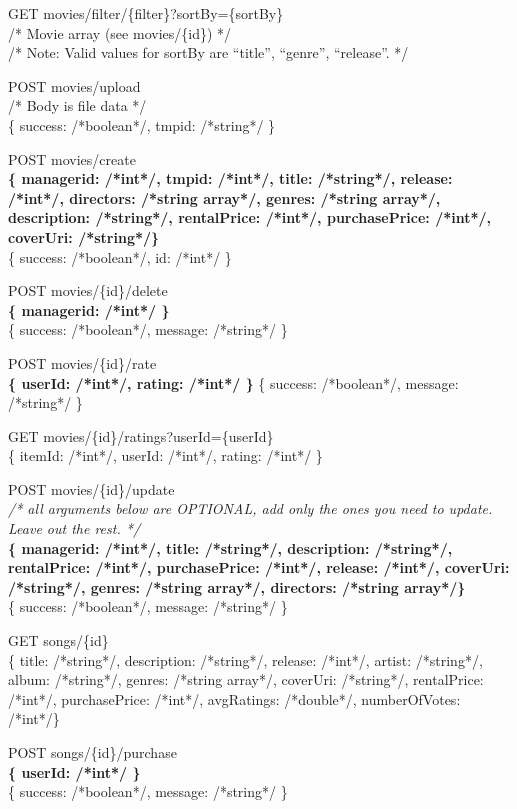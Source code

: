 GET  movies/filter/\{filter\}?sortBy=\{sortBy\} \\
/* Movie array (see movies/\{id\}) */ \\
/* Note: Valid values for sortBy are “title”, “genre”, “release”. */

POST movies/upload \\
/* Body is file data */ \\
\{ success: /*boolean*/, tmpid: /*string*/ \}

POST movies/create \\
\textbf{\{ managerid: /*int*/, tmpid: /*int*/, title: /*string*/, release: /*int*/, directors: /*string array*/, 
genres: /*string array*/, description: /*string*/, rentalPrice: /*int*/, purchasePrice: /*int*/, coverUri: /*string*/\}} \\
\{ success: /*boolean*/, id: /*int*/ \}

POST movies/\{id\}/delete \\
\textbf{\{ managerid: /*int*/ \}} \\
\{ success: /*boolean*/, message: /*string*/ \}

POST movies/\{id\}/rate \\
\textbf{\{ userId: /*int*/, rating: /*int*/ \}}
\{ success: /*boolean*/, message: /*string*/ \}

GET movies/\{id\}/ratings?userId=\{userId\} \\
\{ itemId: /*int*/, userId: /*int*/, rating: /*int*/ \}

POST movies/\{id\}/update \\
\emph{/* all arguments below are OPTIONAL, add only the ones you need to update. Leave out the rest. */} \\
\textbf{\{ managerid: /*int*/, title: /*string*/, description: /*string*/, rentalPrice: /*int*/, purchasePrice: /*int*/, 
release: /*int*/, coverUri: /*string*/, genres: /*string array*/, directors: /*string array*/\}} \\
\{ success: /*boolean*/, message: /*string*/ \}

GET  songs/\{id\} \\
\{ title: /*string*/, description: /*string*/, release: /*int*/, artist: /*string*/, album: /*string*/, genres: /*string array*/, coverUri: /*string*/, rentalPrice: /*int*/, purchasePrice: /*int*/, avgRatings: /*double*/, numberOfVotes: /*int*/\}

POST songs/\{id\}/purchase \\
\textbf{\{ userId: /*int*/ \}} \\
\{ success: /*boolean*/, message: /*string*/ \}

